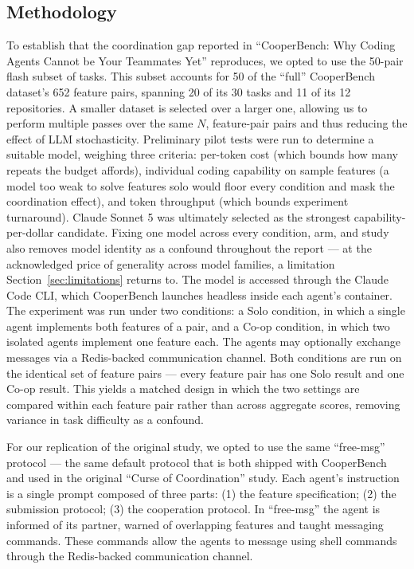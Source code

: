\documentclass[11pt,a4paper]{article}
\begin{document}
\subsection{Methodology}\label{sec:replmethod}

To establish that the coordination gap reported in ``CooperBench: Why Coding Agents Cannot be Your Teammates Yet'' reproduces, we opted to use the 50-pair flash subset of tasks. This subset accounts for 50 of the ``full'' CooperBench dataset's 652 feature pairs, spanning 20 of its 30 tasks and 11 of its 12 repositories. A smaller dataset is selected over a larger one, allowing us to perform multiple passes over the same $N$, feature-pair pairs and thus reducing the effect of LLM stochasticity. Preliminary pilot tests were run to determine a suitable model, weighing three criteria: per-token cost (which bounds how many repeats the budget affords), individual coding capability on sample features (a model too weak to solve features solo would floor every condition and mask the coordination effect), and token throughput (which bounds experiment turnaround). Claude Sonnet 5 was ultimately selected as the strongest capability-per-dollar candidate. Fixing one model across every condition, arm, and study also removes model identity as a confound throughout the report --- at the acknowledged price of generality across model families, a limitation Section~\ref{sec:limitations} returns to. The model is accessed through the Claude Code CLI, which CooperBench launches headless inside each agent's container. The experiment was run under two conditions: a Solo condition, in which a single agent implements both features of a pair, and a Co-op condition, in which two isolated agents implement one feature each. The agents may optionally exchange messages via a Redis-backed communication channel. Both conditions are run on the identical set of feature pairs --- every feature pair has one Solo result and one Co-op result. This yields a matched design in which the two settings are compared within each feature pair rather than across aggregate scores, removing variance in task difficulty as a confound.

For our replication of the original study, we opted to use the same ``free-msg'' protocol --- the same default protocol that is both shipped with CooperBench and used in the original ``Curse of Coordination'' study. Each agent's instruction is a single prompt composed of three parts: (1) the feature specification; (2) the submission protocol; (3) the cooperation protocol. In ``free-msg'' the agent is informed of its partner, warned of overlapping features and taught messaging commands. These commands allow the agents to message using shell commands through the Redis-backed communication channel.
\end{document}
